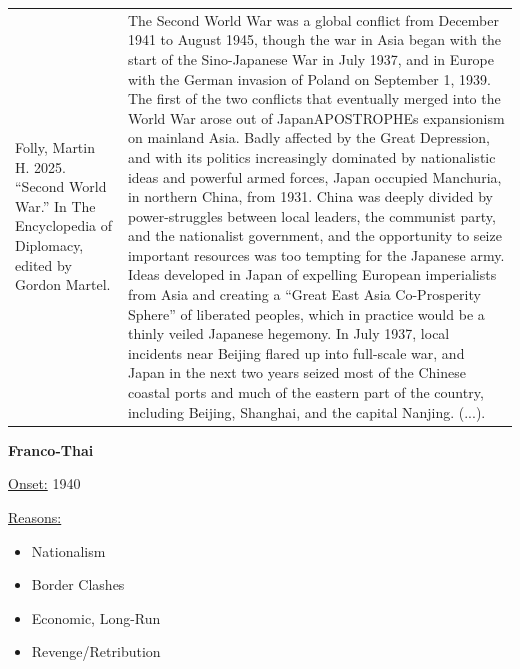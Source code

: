 {\begin{longtable}{p{}p{}}
\\
Folly, Martin H. 2025. “Second World War.” In The Encyclopedia of Diplomacy, edited by Gordon Martel. & The Second World War was a global conflict from December 1941 to August 1945, though the war in Asia began with the start of the Sino-Japanese War in July 1937, and in Europe with the German invasion of Poland on September 1, 1939. The first of the two conflicts that eventually merged into the World War arose out of JapanAPOSTROPHEs expansionism on mainland Asia. Badly affected by the Great Depression, and with its politics increasingly dominated by nationalistic ideas and powerful armed forces, Japan occupied Manchuria, in northern China, from 1931. China was deeply divided by power-struggles between local leaders, the communist party, and the nationalist government, and the opportunity to seize important resources was too tempting for the Japanese army. Ideas developed in Japan of expelling European imperialists from Asia and creating a “Great East Asia Co-Prosperity Sphere” of liberated peoples, which in practice would be a thinly veiled Japanese hegemony. In July 1937, local incidents near Beijing flared up into full-scale war, and Japan in the next two years seized most of the Chinese coastal ports and much of the eastern part of the country, including Beijing, Shanghai, and the capital Nanjing. (...).

\\
\end{longtable}}
\clearpage
         \textbf{Franco-Thai} 

          \underline{Onset:} 1940         

\underline{Reasons:}
\begin{itemize}
\item Nationalism
\item Border Clashes
\item Economic, Long-Run
\item Revenge/Retribution
\end{itemize}

